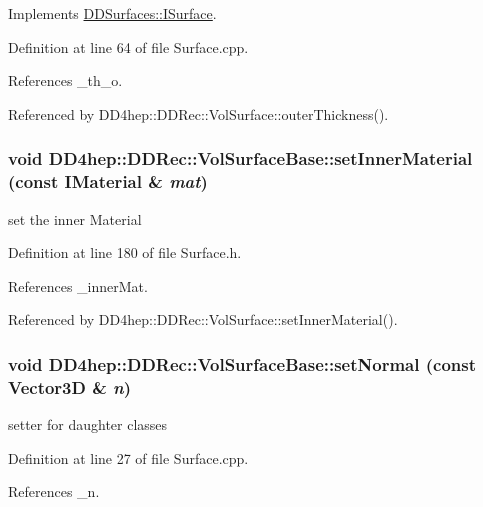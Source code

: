 Implements \hyperlink{class_d_d_surfaces_1_1_i_surface_aa2559a8904e474835c5d24c243a44909}{DDSurfaces::ISurface}.

Definition at line 64 of file Surface.cpp.

References \_\-th\_\-o.

Referenced by DD4hep::DDRec::VolSurface::outerThickness().\hypertarget{class_d_d4hep_1_1_d_d_rec_1_1_vol_surface_base_aa886f2e4301c3093eddbcd6c07ca7f0a}{
\subsubsection[{setInnerMaterial}]{\setlength{\rightskip}{0pt plus 5cm}void DD4hep::DDRec::VolSurfaceBase::setInnerMaterial (const {\bf IMaterial} \& {\em mat})}}
\label{class_d_d4hep_1_1_d_d_rec_1_1_vol_surface_base_aa886f2e4301c3093eddbcd6c07ca7f0a}


set the inner Material 

Definition at line 180 of file Surface.h.

References \_\-innerMat.

Referenced by DD4hep::DDRec::VolSurface::setInnerMaterial().\hypertarget{class_d_d4hep_1_1_d_d_rec_1_1_vol_surface_base_a1ccc4ac2bd7ff9293b01798844d243e1}{
\subsubsection[{setNormal}]{\setlength{\rightskip}{0pt plus 5cm}void DD4hep::DDRec::VolSurfaceBase::setNormal (const {\bf Vector3D} \& {\em n})}}
\label{class_d_d4hep_1_1_d_d_rec_1_1_vol_surface_base_a1ccc4ac2bd7ff9293b01798844d243e1}


setter for daughter classes 

Definition at line 27 of file Surface.cpp.

References \_\-n.

